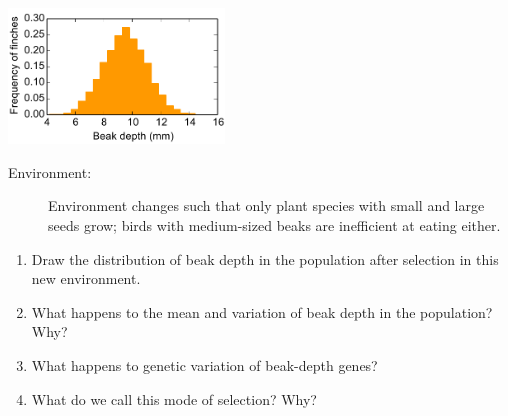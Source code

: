 \begin{frame}[t]
\begin{adjustwidth}{-1.5em}{-1.5em}
    \small
    \vspace{-0.3cm}
    \includegraphics[width=0.43\textwidth]{../images/my-beak-depth-histogram.pdf}

    \vspace{-0.2cm}
    \begin{description}
        \item[Environment:]
            Environment changes such that only plant species with small and
            large seeds grow; birds with medium-sized beaks are
            inefficient at eating either.
    \end{description}

    \vspace{-0.2cm}
    \begin{enumerate}
        \item Draw the distribution of beak depth in the population after
            selection in this new environment.
        \item What happens to the mean and variation of beak depth in the
                population? Why?
        \item What happens to genetic variation of beak-depth genes?
        \item What do we call this mode of selection? Why?
    \end{enumerate}
\end{adjustwidth}
\end{frame}

